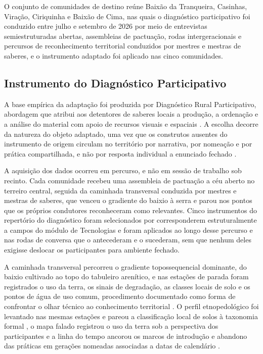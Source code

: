 \documentclass[preprint,authoryear,12pt]{elsarticle}
\begin{document}
O conjunto de comunidades de destino reúne Baixão da Tranqueira, Casinhas, Viração, Ciriquinha e Baixão de Cima, nas quais o diagnóstico participativo foi conduzido entre julho e setembro de 2026 por meio de entrevistas semiestruturadas abertas, assembleias de pactuação, rodas intergeracionais e percursos de reconhecimento territorial conduzidos por mestres e mestras de saberes, e o instrumento adaptado foi aplicado nas cinco comunidades.




\subsection{Instrumento do Diagnóstico Participativo}

A base empírica da adaptação foi produzida por Diagnóstico Rural Participativo, abordagem que atribui aos detentores de saberes locais a produção, a ordenação e a análise do material com apoio de recursos visuais e espaciais \citep{Chambers1994origins,Chambers1994analysis,Verdejo2006,Freire1971,Bordenave1983}. A escolha decorre da natureza do objeto adaptado, uma vez que os construtos ausentes do instrumento de origem circulam no território por narrativa, por nomeação e por prática compartilhada, e não por resposta individual a enunciado fechado \citep{Cornwall1995,CaporalCostabeber2004}.

A aquisição dos dados ocorreu em percurso, e não em sessão de trabalho sob recinto. Cada comunidade recebeu uma assembleia de pactuação a céu aberto no terreiro central, seguida da caminhada transversal conduzida por mestres e mestras de saberes, que venceu o gradiente do baixio à serra e parou nos pontos que os próprios condutores reconheceram como relevantes. Cinco instrumentos do repertório do diagnóstico foram selecionados por corresponderem estruturalmente a campos do módulo de Tecnologias \citep{Geilfus2008,Narayanasamy2009,Kumar2002,CunhaFaria2006,Oakley1985} e foram aplicados ao longo desse percurso e nas rodas de conversa que o antecederam e o sucederam, sem que nenhum deles exigisse deslocar os participantes para ambiente fechado.

A caminhada transversal percorreu o gradiente topossequencial dominante, do baixio cultivado ao topo do tabuleiro arenítico, e nas estações de parada foram registrados o uso da terra, os sinais de degradação, as classes locais de solo e os pontos de água de uso comum, procedimento documentado como forma de confrontar o olhar técnico ao conhecimento territorial \citep{Mahiri1998}. O perfil etnopedológico foi levantado nas mesmas estações e pareou a classificação local de solos à taxonomia formal \citep{BarreraBassols2003}, o mapa falado registrou o uso da terra sob a perspectiva dos participantes \citep{Chambers2006} e a linha do tempo ancorou os marcos de introdução e abandono das práticas em gerações nomeadas associadas a datas de calendário \citep{Vansina1985}.
\end{document}
